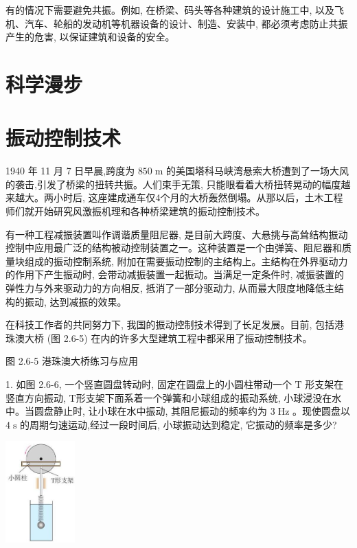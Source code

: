 \documentclass[10pt]{article}
\begin{document}
有的情况下需要避免共振。例如, 在桥梁、码头等各种建筑的设计施工中, 以及飞机、汽车、轮船的发动机等机器设备的设计、制造、安装中, 都必须考虑防止共振产生的危害, 以保证建筑和设备的安全。

\section*{科学漫步}

\section*{振动控制技术}

1940 年 11 月 7 日早晨,跨度为 \({850}\mathrm{\;m}\) 的美国塔科马峡湾悬索大桥遭到了一场大风的袭击,引发了桥梁的扭转共振。人们束手无策, 只能眼看着大桥扭转晃动的幅度越来越大。两小时后, 这座建成通车仅4个月的大桥轰然倒塌。从那以后，土木工程师们就开始研究风激振机理和各种桥梁建筑的振动控制技术。

有一种工程减振装置叫作调谐质量阻尼器, 是目前大跨度、大悬挑与高耸结构振动控制中应用最广泛的结构被动控制装置之一。这种装置是一个由弹簧、阻尼器和质量块组成的振动控制系统, 附加在需要振动控制的主结构上。主结构在外界驱动力的作用下产生振动时, 会带动减振装置一起振动。当满足一定条件时, 减振装置的弹性力与外来驱动力的方向相反, 抵消了一部分驱动力, 从而最大限度地降低主结构的振动, 达到减振的效果。

在科技工作者的共同努力下, 我国的振动控制技术得到了长足发展。目前, 包括港珠澳大桥 (图 2.6-5) 在内的许多大型建筑工程中都采用了振动控制技术。

图 2.6-5 港珠澳大桥练习与应用

1. 如图 2.6-6, 一个竖直圆盘转动时, 固定在圆盘上的小圆柱带动一个 \(\mathrm{T}\) 形支架在竖直方向振动, T形支架下面系着一个弹簧和小球组成的振动系统, 小球浸没在水中。当圆盘静止时, 让小球在水中振动, 其阻尼振动的频率约为 \(3\mathrm{\;{Hz}}\) 。现使圆盘以 \(4\mathrm{\;s}\) 的周期匀速运动,经过一段时间后, 小球振动达到稳定, 它振动的频率是多少?

\begin{center}
\includegraphics[max width=0.2\textwidth]{images/01910e4c-ebb8-7d2c-8f2f-2375bc1d2d12_63_187144.jpg}
\end{center}
\end{document}
